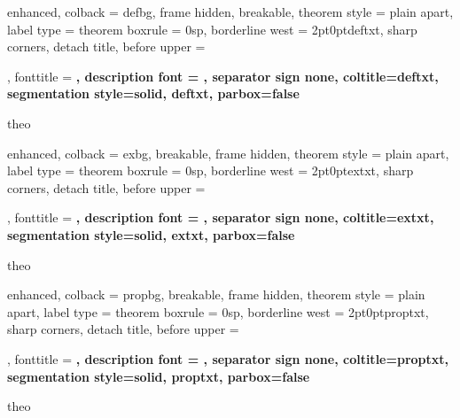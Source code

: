 {%
	enhanced,
	colback = defbg,
	frame hidden,
    breakable,
    theorem style = plain apart,
    label type = theorem
	boxrule = 0sp,
	borderline west = {2pt}{0pt}{deftxt},
	sharp corners,
	detach title,
	before upper = \tcbtitle\par\smallskip,
	fonttitle = \bfseries\sffamily\large,
	description font = \mdseries,
	separator sign none,
    coltitle=deftxt,
	segmentation style={solid, deftxt},
    parbox=false
}
{theo}

{%
	enhanced,
	colback = exbg,
    breakable,
	frame hidden,
    theorem style = plain apart,
    label type = theorem
	boxrule = 0sp,
	borderline west = {2pt}{0pt}{extxt},
	sharp corners,
	detach title,
	before upper = \tcbtitle\par\smallskip,
	fonttitle = \bfseries\sffamily\large,
	description font = \mdseries,
	separator sign none,
    coltitle=extxt,
	segmentation style={solid, extxt},
    parbox=false
}
{theo}

{%
	enhanced,
	colback = propbg,
    breakable,
	frame hidden,
    theorem style = plain apart,
    label type = theorem
	boxrule = 0sp,
	borderline west = {2pt}{0pt}{proptxt},
	sharp corners,
	detach title,
	before upper = \tcbtitle\par\smallskip,
	fonttitle = \bfseries\sffamily\large,
	description font = \mdseries,
	separator sign none,
    coltitle=proptxt,
	segmentation style={solid, proptxt},
    parbox=false
}
{theo}


\newcommand{\thrm}[2]{\begin{theorem}{#1}{}#2\end{theorem}}
\newcommand{\coro}[2]{\begin{corollary}{#1}{}#2\end{corollary}}
\newcommand{\lemma}[2]{\begin{Lemma}{#1}{}#2\end{Lemma}}
\newcommand{\ex}[2]{\begin{example}{#1}{}#2\end{example}}
\newcommand{\defn}[2]{\begin{definition}{#1}{}#2\end{definition}}
\newcommand{\prop}[2]{\begin{proposition}{#1}{}#2\end{proposition}}

